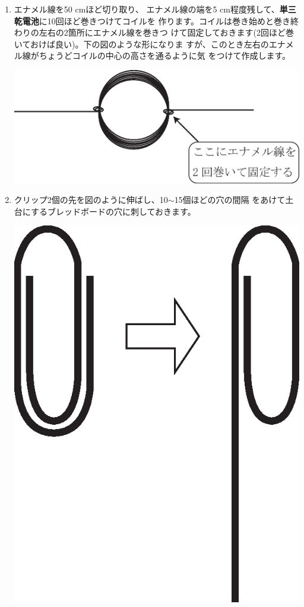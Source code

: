 \begin{enumerate}

\item エナメル線を50 cmほど切り取り、
エナメル線の端を5 cm程度残して、{\bf 単三乾電池}に10回ほど巻きつけてコイルを
作ります。コイルは巻き始めと巻き終わりの左右の2箇所にエナメル線を巻きつ
けて固定しておきます(2回ほど巻いておけば良い)。下の図のような形になりま
すが、このとき左右のエナメル線がちょうどコイルの中心の高さを通るように気
をつけて作成します。
\begin{center}
\includegraphics[scale=0.45]{07_EleMag/coil.eps}
\end{center}

\item
\begin{minipage}[t]{10cm}
クリップ2個の先を図のように伸ばし、10$\sim$15個ほどの穴の間隔
をあけて土台にするブレッドボードの穴に刺しておきます。
\end{minipage}
\begin{minipage}[c]{3cm}
\hspace*{1cm}
\includegraphics[scale=0.35]{07_EleMag/clip.eps}
\end{minipage}


\end{enumerate}
